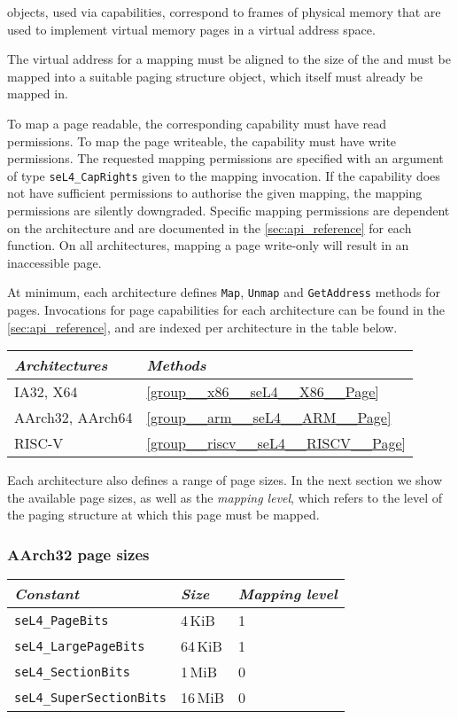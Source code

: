  objects, used via  capabilities, correspond to frames of physical memory that
are used to implement virtual memory pages in a virtual address space.

The virtual address for a  mapping must be aligned to the size of the  and must
be mapped into a suitable paging structure object, which itself must already be mapped in.

To map a page readable, the corresponding  capability must have read permissions. To map
the page writeable, the capability must have write permissions. The requested mapping permissions
are specified with an argument of type \texttt{seL4\_CapRights} given to the mapping invocation. If
the capability does not have sufficient permissions to authorise the given mapping, the mapping
permissions are silently downgraded. Specific mapping permissions are dependent on the architecture
and are documented in the \autoref{sec:api_reference} for each function. On all architectures,
mapping a page write-only will result in an inaccessible page.

At minimum, each architecture defines \texttt{Map}, \texttt{Unmap} and
\texttt{GetAddress} methods for pages.
Invocations for page capabilities for each architecture can be found in the \autoref{sec:api_reference}, and
are indexed per architecture in the table below.

\begin{tabularx}{\textwidth}{Xl} \toprule
\emph{Architectures} & \emph{Methods} \\ \midrule
IA32, X64            & \autoref{group__x86__seL4__X86__Page} \\
AArch32, AArch64     & \autoref{group__arm__seL4__ARM__Page} \\
    RISC-V           & \autoref{group__riscv__seL4__RISCV__Page} \\
\bottomrule
\end{tabularx}

Each architecture also defines a range of page sizes. In the next section we show the available page
sizes, as well as the \emph{mapping level}, which refers to
the level of the paging structure at which this page must be mapped.

\subsubsection{AArch32 page sizes}

\begin{tabularx}{\textwidth}{Xll} \toprule
    \emph{Constant}             & \emph{Size} & \emph{Mapping level} \\ \midrule
    \texttt{seL4\_PageBits}      & 4\,KiB      & 1                   \\
    \texttt{seL4\_LargePageBits} & 64\,KiB     & 1                   \\
    \texttt{seL4\_SectionBits}   & 1\,MiB      & 0                   \\
    \texttt{seL4\_SuperSectionBits} & 16\,MiB  & 0                   \\
    \bottomrule
\end{tabularx}

